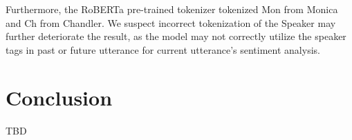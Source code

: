 \documentclass[11pt]{article}
\begin{document}
Furthermore, the RoBERTa pre-trained tokenizer tokenized Mon from Monica and Ch from Chandler. We suspect incorrect tokenization of the Speaker may further deteriorate the result, as the model may not correctly utilize the speaker tags in past or future utterance for current utterance's sentiment analysis.


\section{Conclusion}
\label{sect:conclusion}

TBD


\end{document}
